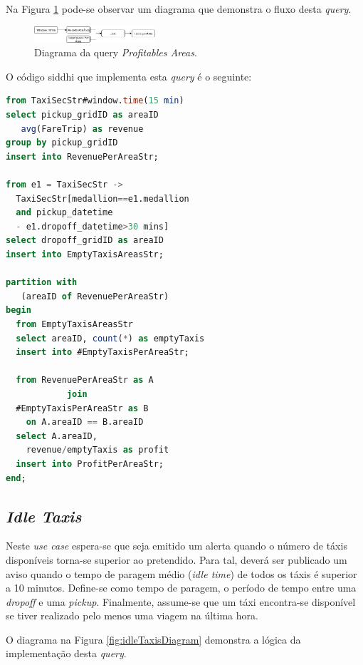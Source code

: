 \documentclass[article]{IEEEtran}
\begin{document}
Na Figura \ref{fig:profitablesAreasDiagram} pode-se observar um diagrama que demonstra o fluxo desta \textit{query}.

\begin{figure}[hbtp]
    \centering
        \includegraphics[width=0.4\textwidth]{images/profitableAreasDiagram_v3}
    \caption{Diagrama da query \textit{Profitables Areas}.}
    \label{fig:profitablesAreasDiagram}
\end{figure}

O código siddhi que implementa esta \textit{query} é o seguinte:

\begin{lstlisting}[language=SQL]
from TaxiSecStr#window.time(15 min)
select pickup_gridID as areaID
   avg(FareTrip) as revenue
group by pickup_gridID
insert into RevenuePerAreaStr;

from e1 = TaxiSecStr ->
  TaxiSecStr[medallion==e1.medallion 
  and pickup_datetime 
  - e1.dropoff_datetime>30 mins]
select dropoff_gridID as areaID
insert into EmptyTaxisAreasStr;

partition with 
   (areaID of RevenuePerAreaStr)
begin
  from EmptyTaxisAreasStr
  select areaID, count(*) as emptyTaxis
  insert into #EmptyTaxisPerAreaStr;

  from RevenuePerAreaStr as A 
            join
  #EmptyTaxisPerAreaStr as B 
    on A.areaID == B.areaID
  select A.areaID,
    revenue/emptyTaxis as profit
  insert into ProfitPerAreaStr;
end;
\end{lstlisting}

\subsection{\textit{Idle Taxis}}

Neste \textit{use case} espera-se que seja emitido um alerta quando o número de táxis disponíveis torna-se superior ao pretendido. Para tal, deverá ser publicado um aviso quando o tempo de paragem médio (\textit{idle time}) de todos os táxis é superior a 10 minutos. Define-se como tempo de paragem, o período de tempo entre uma \textit{dropoff} e uma \textit{pickup}. Finalmente, assume-se que um táxi encontra-se disponível se tiver realizado pelo menos uma viagem na última hora.

O diagrama na Figura \ref{fig:idleTaxisDiagram} demonstra a lógica da implementação desta \textit{query}.
\end{document}
